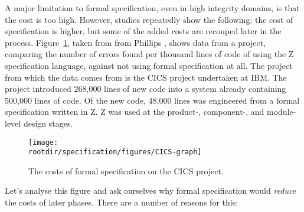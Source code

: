 A major limitation to formal specification, even in high integrity domains, is that the cost is too high. However, studies repeatedly show the following: the cost of specification is higher, but some of the added costs are recouped later in the process. Figure~\ref{fig:specification:costs-of-formal-specification}, taken from from Phillips \cite{phillips89}, shows data from a project, comparing the number of errors found per thousand lines of code of using the Z specification language, against not using formal specification at all. The project from which the data comes from is the CICS project undertaken at IBM. The project introduced 268,000 lines of new code into a system already containing 500,000 lines of code. Of the new code, 48,000 lines was engineered from a formal specification written in Z. Z was used at the product-, component-, and module-level design stages.

\begin{figure}[!h]
\centering
\texttt{[image: \\rootdir/specification/figures/CICS-graph]}
\caption{The costs of formal specification on the CICS project.}
\label{fig:specification:costs-of-formal-specification}
\end{figure}

Let's analyse this figure and ask ourselves why formal specification would \emph{reduce} the costs of later phases. There are a number of reasons for this:

